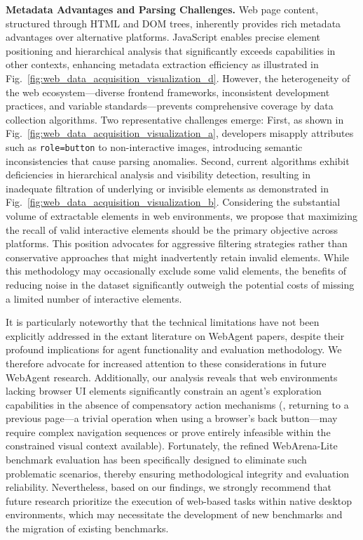 \textbf{Metadata Advantages and Parsing Challenges.} Web page content, structured through HTML and DOM trees, inherently provides rich metadata advantages over alternative platforms. JavaScript enables precise element positioning and hierarchical analysis that significantly exceeds capabilities in other contexts, enhancing metadata extraction efficiency as illustrated in Fig.~\ref{fig:web_data_acquisition_visualization_d}. However, the heterogeneity of the web ecosystem—diverse frontend frameworks, inconsistent development practices, and variable standards—prevents comprehensive coverage by data collection algorithms. Two representative challenges emerge: First, as shown in Fig.~\ref{fig:web_data_acquisition_visualization_a}, developers misapply attributes such as \texttt{role=button} to non-interactive images, introducing semantic inconsistencies that cause parsing anomalies. Second, current algorithms exhibit deficiencies in hierarchical analysis and visibility detection, resulting in inadequate filtration of underlying or invisible elements as demonstrated in Fig.~\ref{fig:web_data_acquisition_visualization_b}. Considering the substantial volume of extractable elements in web environments, we propose that maximizing the recall of valid interactive elements should be the primary objective across platforms. This position advocates for aggressive filtering strategies rather than conservative approaches that might inadvertently retain invalid elements. While this methodology may occasionally exclude some valid elements, the benefits of reducing noise in the dataset significantly outweigh the potential costs of missing a limited number of interactive elements.

It is particularly noteworthy that the technical limitations have not been explicitly addressed in the extant literature on WebAgent papers, despite their profound implications for agent functionality and evaluation methodology. We therefore advocate for increased attention to these considerations in future WebAgent research. Additionally, our analysis reveals that web environments lacking browser UI elements significantly constrain an agent's exploration capabilities in the absence of compensatory action mechanisms (\eg, returning to a previous page—a trivial operation when using a browser's back button—may require complex navigation sequences or prove entirely infeasible within the constrained visual context available). Fortunately, the refined WebArena-Lite benchmark evaluation has been specifically designed to eliminate such problematic scenarios, thereby ensuring methodological integrity and evaluation reliability. Nevertheless, based on our findings, we strongly recommend that future research prioritize the execution of web-based tasks within native desktop environments, which may necessitate the development of new benchmarks and the migration of existing benchmarks.

